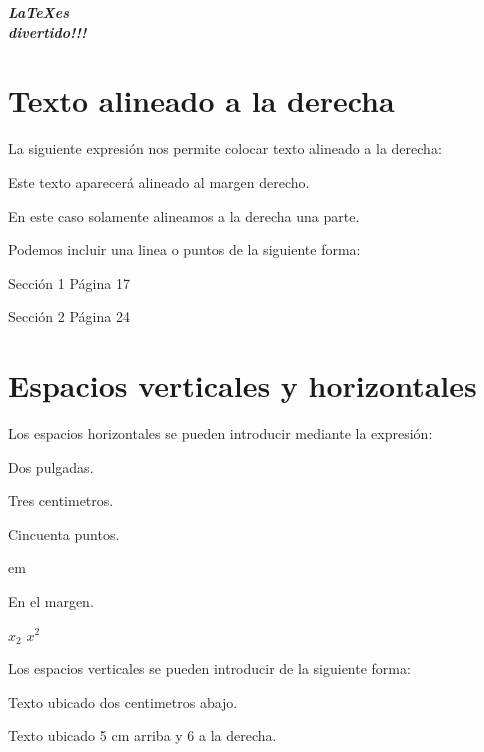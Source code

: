 \documentclass[letterpaper,12pt]{article}
\begin{document}
\begin{center}
\LARGE{\textbf{\textit{\LaTeX es \\ divertido!!!}}}
\end{center}

\section{Texto alineado a la derecha}

La siguiente expresión nos permite colocar texto alineado a la derecha:

\hfill Este texto aparecerá alineado al margen derecho.

En este caso solamente alineamos a la derecha \hfill una parte.

Podemos incluir una linea o puntos de la siguiente forma:

Sección 1 \hrulefill Página 17

Sección 2 \dotfill Página 24

\section{Espacios verticales y horizontales}

Los espacios horizontales se pueden introducir mediante la expresión:

\hspace{2in}Dos pulgadas.

\hspace{3cm}Tres centimetros.
\hspace{3.5cm}

\hspace{50pt}Cincuenta puntos.

\hspace{3em} em

\hspace{-3cm}En el margen.

$x_{2}$ \hspace{4cm} $x^{2}$

Los espacios verticales se pueden introducir de la siguiente forma:

\vspace{2cm}Texto ubicado dos centimetros abajo.

\vspace{-5cm} \hspace{6cm} Texto ubicado 5 cm arriba y 6 a la derecha.

\vspace{3cm}
\end{document}
